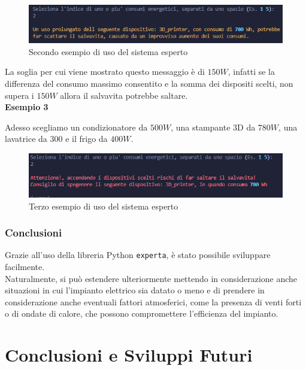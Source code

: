 \documentclass[12pt, letterpaper]{article}
\begin{document}
\begin{figure}[h]
      \centering
      \includegraphics[scale=0.70]{sistema-esperto-esempio-2.png}
      \caption{Secondo esempio di uso del sistema esperto}
\end{figure}

\noindent La soglia per cui viene mostrato questo messaggio è di $150W$, infatti se la differenza del
consumo massimo consentito e la somma dei dispositi scelti, non supera i $150W$ allora il salvavita potrebbe
saltare. \\

\noindent \textbf{Esempio 3}

\noindent Adesso scegliamo un condizionatore da $500W$, una stampante 3D da $780W$, una
lavatrice da $300$ e il frigo da $400W$.

\begin{figure}[h]
      \centering
      \includegraphics[scale=0.8]{sistema-esperto-esempio-3.png}
      \caption{Terzo esempio di uso del sistema esperto}
\end{figure}

\subsubsection{Conclusioni}

Grazie all'uso della libreria Python \texttt{experta}, è stato possibile sviluppare facilmente. \\

\noindent Naturalmente, si può estendere ulteriormente mettendo in considerazione anche situazioni in cui
l'impianto elettrico sia datato o meno e di prendere in considerazione anche
eventuali fattori atmosferici, come la presenza di venti forti o di ondate di calore, che
possono compromettere l'efficienza del impianto.


\section{Conclusioni e Sviluppi Futuri}
\end{document}
